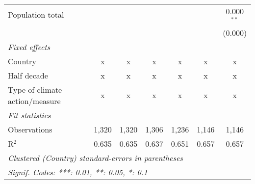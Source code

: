 \begin{tabular}{lcccccc}
   Population total                     &         &         &              &         &              & 0.000$^{**}$\\   
                                        &         &         &              &         &              & (0.000)\\   
   \emph{Fixed effects}\\
   Country                              & x       & x       & x            & x       & x            & x\\  
   Half decade                          & x       & x       & x            & x       & x            & x\\  
   Type of climate action/measure       & x       & x       & x            & x       & x            & x\\  
   \midrule \emph{Fit statistics}\\
   Observations                         & 1,320   & 1,320   & 1,306        & 1,236   & 1,146        & 1,146\\  
   R$^2$                                & 0.635   & 0.635   & 0.637        & 0.651   & 0.657        & 0.657\\  
   \midrule
   \multicolumn{7}{l}{\emph{Clustered (Country) standard-errors in parentheses}}\\
   \multicolumn{7}{l}{\emph{Signif. Codes: ***: 0.01, **: 0.05, *: 0.1}}\\
\end{tabular}
\par\endgroup


